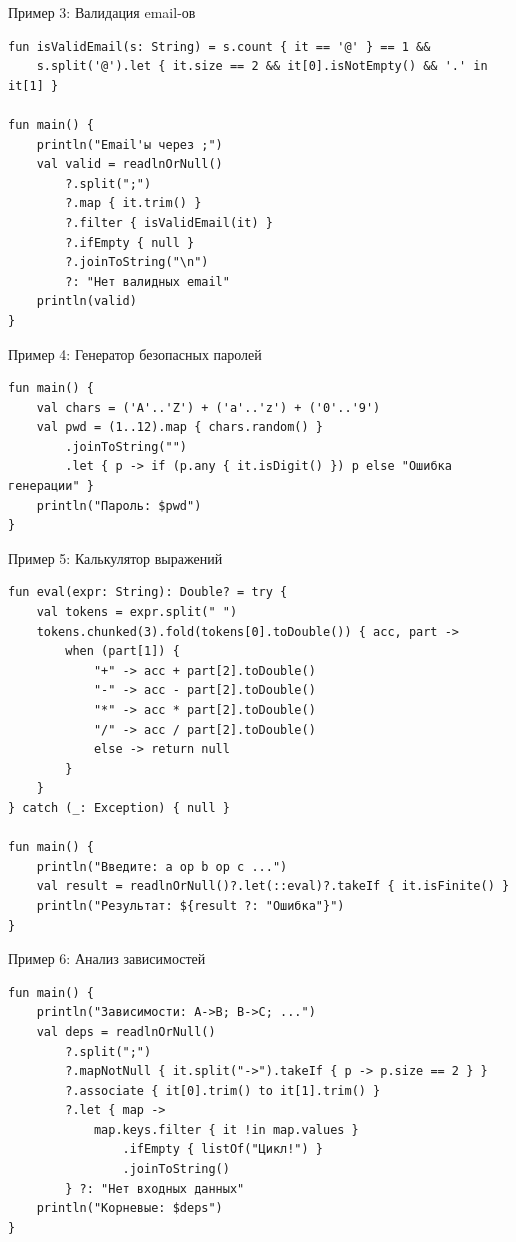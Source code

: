 \documentclass[aspectratio=169]{beamer}
\begin{document}
\begin{frame}[fragile]{Пример 3: Валидация email-ов}
\lstset{language=Kotlin}
\begin{lstlisting}
fun isValidEmail(s: String) = s.count { it == '@' } == 1 &&
    s.split('@').let { it.size == 2 && it[0].isNotEmpty() && '.' in it[1] }

fun main() {
    println("Email'ы через ;")
    val valid = readlnOrNull()
        ?.split(";")
        ?.map { it.trim() }
        ?.filter { isValidEmail(it) }
        ?.ifEmpty { null }
        ?.joinToString("\n")
        ?: "Нет валидных email"
    println(valid)
}
\end{lstlisting}
\end{frame}

\begin{frame}[fragile]{Пример 4: Генератор безопасных паролей}
\lstset{language=Kotlin}
\begin{lstlisting}
fun main() {
    val chars = ('A'..'Z') + ('a'..'z') + ('0'..'9')
    val pwd = (1..12).map { chars.random() }
        .joinToString("")
        .let { p -> if (p.any { it.isDigit() }) p else "Ошибка генерации" }
    println("Пароль: $pwd")
}
\end{lstlisting}
\end{frame}

\begin{frame}[fragile]{Пример 5: Калькулятор выражений}
\lstset{language=Kotlin}
\begin{lstlisting}
fun eval(expr: String): Double? = try {
    val tokens = expr.split(" ")
    tokens.chunked(3).fold(tokens[0].toDouble()) { acc, part ->
        when (part[1]) {
            "+" -> acc + part[2].toDouble()
            "-" -> acc - part[2].toDouble()
            "*" -> acc * part[2].toDouble()
            "/" -> acc / part[2].toDouble()
            else -> return null
        }
    }
} catch (_: Exception) { null }

fun main() {
    println("Введите: a op b op c ...")
    val result = readlnOrNull()?.let(::eval)?.takeIf { it.isFinite() }
    println("Результат: ${result ?: "Ошибка"}")
}
\end{lstlisting}
\end{frame}

\begin{frame}[fragile]{Пример 6: Анализ зависимостей}
\lstset{language=Kotlin}
\begin{lstlisting}
fun main() {
    println("Зависимости: A->B; B->C; ...")
    val deps = readlnOrNull()
        ?.split(";")
        ?.mapNotNull { it.split("->").takeIf { p -> p.size == 2 } }
        ?.associate { it[0].trim() to it[1].trim() }
        ?.let { map ->
            map.keys.filter { it !in map.values }
                .ifEmpty { listOf("Цикл!") }
                .joinToString()
        } ?: "Нет входных данных"
    println("Корневые: $deps")
}
\end{lstlisting}
\end{frame}
\end{document}
